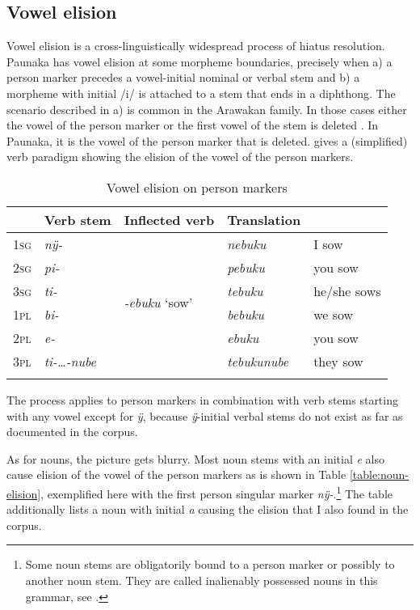 \subsection{Vowel elision} \label{section:Vowel_elision}

Vowel elision is a cross-linguistically widespread process of hiatus resolution. Paunaka has vowel elision at some morpheme boundaries, precisely when a) a person marker precedes a vowel-initial nominal or verbal stem and b) a morpheme with initial /i/ is attached to a stem that ends in a diphthong.  
The scenario described in a) is common in the Arawakan family. In those cases either the vowel of the person marker or the first vowel of the stem is deleted \citep[385]{Payne1991}. In Paunaka, it is the vowel of the person marker that is deleted.  gives a (simplified) verb paradigm showing the elision of the vowel of the person markers.


\begin{table}[t]
\caption{Vowel elision on person markers}

\begin{tabular}{lllll}
\lsptoprule
\multicolumn{2}{l}{Person marker} & Verb stem & Inflected verb & Translation\\
\midrule
1\textsc{sg} & \textit{nÿ-} & \multirow{6}{*}{\textit{-ebuku} ‘sow’} & \textit{nebuku} & I sow\\
2\textsc{sg} & \textit{pi-} &  & \textit{pebuku} & you sow\\
3\textsc{sg} & \textit{ti-} &  & \textit{tebuku} & he/she sows\\
1\textsc{pl} & \textit{bi-} &  & \textit{bebuku} & we sow\\
2\textsc{pl} & \textit{e-} &  & \textit{ebuku} & you sow\\
3\textsc{pl} & \textit{ti-…-nube} &  & \textit{tebukunube} &  they sow\\
\lspbottomrule
\end{tabular}

\label{table:elision1}
\end{table}
	
The process applies to person markers in combination with verb stems starting with any vowel except for \textit{ÿ}, because \textit{ÿ}-initial verbal stems do not exist as far as documented in the corpus. 

As for nouns, the picture gets blurry. Most noun stems with an initial \textit{e} also cause elision of the vowel of the person markers as is shown in Table  \ref{table:noun-elision}, exemplified here with the first person singular marker \textit{nÿ-}.\footnote{Some noun stems are obligatorily bound to a person marker or possibly to another noun stem. They are called inalienably possessed nouns in this grammar, see .} The table additionally lists a noun with initial \textit{a} causing the elision that I also found in the corpus.


